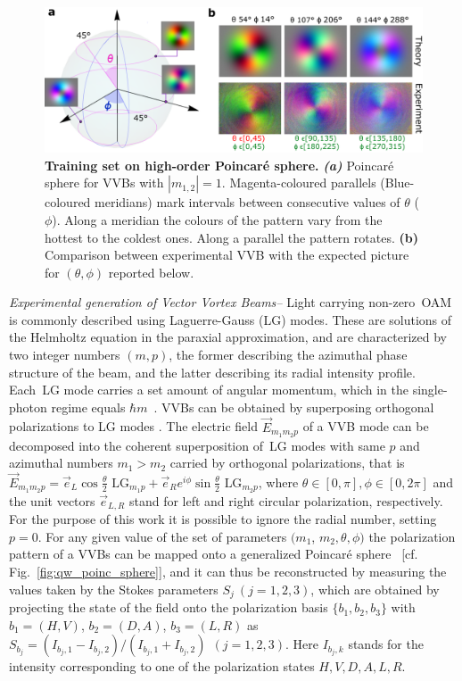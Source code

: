 \begin{figure}
	\centering
	\includegraphics[width=\textwidth]{Figures/quantum-walks/VVBs-results_th_ph_old.pdf}
	\caption{
		\textbf{Training set on high-order Poincar\'e sphere.}
		\textbf{\emph{(a)}} Poincar\'e sphere for \acp{VVB} with $|m_{1,2}|=1$.
		Magenta-coloured parallels (Blue-coloured meridians) mark intervals between consecutive values of $\theta$ ($\phi$). 
	    Along a meridian the colours of the pattern vary from the hottest to the coldest ones. Along a parallel the pattern rotates. 
	    \textbf{(b)} Comparison between experimental \ac{VVB} with the expected picture for $(\theta, \phi)$ reported below.
	}
\end{figure}


\textit{Experimental generation of Vector Vortex Beams--} 
Light carrying non-zero~\ac{OAM} is commonly described using Laguerre-Gauss (\ac{LG}) modes.
These are solutions of the Helmholtz equation in the paraxial approximation, and are characterized by two integer numbers $(m, p)$, the former describing the azimuthal phase structure of the beam, and the latter describing its radial intensity profile.
Each~\ac{LG} mode carries a set amount of angular momentum, which in the single-photon regime equals $\hbar m$~\cite{allen1992orbital}.
\acp{VVB} can be obtained by superposing orthogonal polarizations to \ac{LG} modes \cite{padgett2004lights}. 
The electric field $\Vec{E}_{m_1m_2p}$ of a \ac{VVB} mode can be decomposed into the coherent superposition of~\ac{LG} modes with same $p$ and azimuthal numbers $m_1>m_2$ carried by orthogonal polarizations, that is
$    \Vec{E}_{m_1m_2p}=\Vec{e}_L \cos{ \frac{\theta}{2}}\text{ LG$_{m_1p}$} +\Vec{e}_R e^{i \phi} \sin{ \frac{\theta}{2}}\text{ LG$_{m_2p}$}$,
where $\theta\in[0,\pi], \phi\in[0,2\pi]$ and the unit vectors $\Vec{e}_{L,R}$ stand for left and right circular polarization, respectively.
For the purpose of this work it is possible to ignore the radial number, setting $p=0$. For any given value of the set of parameters $(m_1$, $m_2, \theta, \phi)$  the polarization pattern of a \acp{VVB} can be mapped onto a generalized Poincar\'e sphere~\cite{milione2011higherorder} [cf. Fig.~\ref{fig:qw_poinc_sphere}], and 
it can thus be reconstructed by measuring the values taken by the Stokes parameters $S_{j}~(j=1,2,3)$, which are obtained by projecting the state of the field onto the polarization basis $\{b_1,b_2,b_3\}$ with $b_1=( H,V )$, $b_2=( D,A )$, $b_3=( L,R )$ as 
    $    S_{b_j}=(I_{b_j,1}-I_{b_j,2})/(I_{b_j,1}+I_{b_j,2})~~(j=1,2,3)$.
Here $I_{b_j,k}$ stands for the intensity corresponding to one of the polarization states $H,V,D,A,L,R$.

